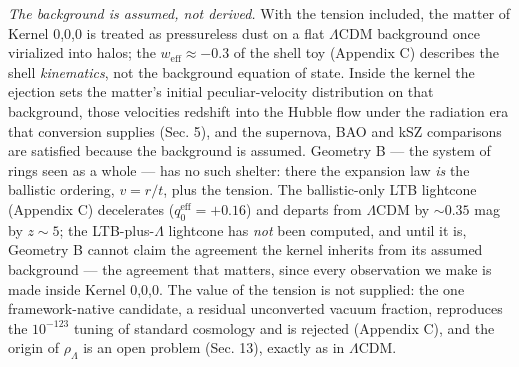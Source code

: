 \documentclass[
  11pt,
]{article}
\begin{document}
\emph{The background is assumed, not derived.} With the tension
included, the matter of Kernel 0,0,0 is treated as pressureless dust on
a flat \(\Lambda\)CDM background once virialized into halos; the
\(w_{\text{eff}} \approx -0.3\) of the shell toy (Appendix C) describes
the shell \emph{kinematics}, not the background equation of state.
Inside the kernel the ejection sets the matter's initial
peculiar-velocity distribution on that background, those velocities
redshift into the Hubble flow under the radiation era that conversion
supplies (Sec. 5), and the supernova, BAO and kSZ comparisons are
satisfied because the background is assumed. Geometry B --- the system
of rings seen as a whole --- has no such shelter: there the expansion
law \emph{is} the ballistic ordering, \(v = r/t\), plus the tension. The
ballistic-only LTB lightcone (Appendix C) decelerates
(\(q_0^{\text{eff}} = +0.16\)) and departs from \(\Lambda\)CDM by
\(\sim\!0.35\) mag by \(z \sim 5\); the LTB-plus-\(\Lambda\) lightcone
has \emph{not} been computed, and until it is, Geometry B cannot claim
the agreement the kernel inherits from its assumed background --- the
agreement that matters, since every observation we make is made inside
Kernel 0,0,0. The value of the tension is not supplied: the one
framework-native candidate, a residual unconverted vacuum fraction,
reproduces the \(10^{-123}\) tuning of standard cosmology and is
rejected (Appendix C), and the origin of \(\rho_\Lambda\) is an open
problem (Sec. 13), exactly as in \(\Lambda\)CDM.
\end{document}
